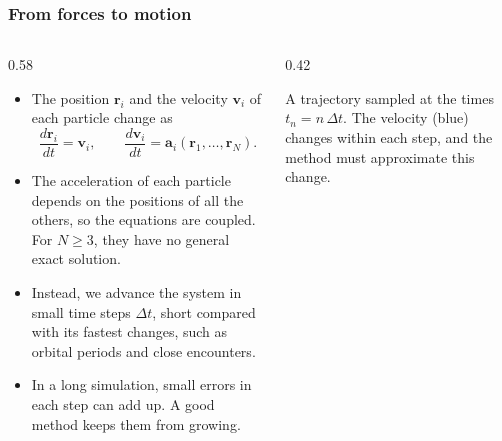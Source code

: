 \begin{frame}
  \frametitle{From forces to motion}
  \begin{columns}[T]
    \begin{column}{0.58\textwidth}
      \begin{itemize}
        \item The position $\mathbf{r}_i$ and the velocity $\mathbf{v}_i$ of each particle change as
          \[ \frac{d\mathbf{r}_i}{dt} = \mathbf{v}_i, \qquad \frac{d\mathbf{v}_i}{dt} = \mathbf{a}_i(\mathbf{r}_1, \ldots, \mathbf{r}_N). \]
        \item The acceleration of each particle depends on the positions of all the others, so the equations are coupled. For $N \geq 3$, they have no general exact solution.
        \item Instead, we advance the system in small time steps $\Delta t$, short compared with its fastest changes, such as orbital periods and close encounters.
        \item In a long simulation, small errors in each step can add up. A good method keeps them from growing.
      \end{itemize}
    \end{column}

    \begin{column}{0.42\textwidth}
      \centering

      \vspace*{2mm}
      \raggedright
      {\small A trajectory sampled at the times $t_n = n \, \Delta t$. The velocity (blue) changes within each step, and the method must approximate this change.}
    \end{column}
  \end{columns}
\end{frame}


